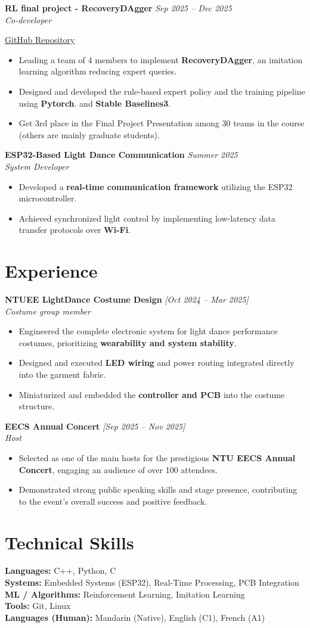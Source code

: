 \documentclass[10pt,a4paper]{article}
\newcommand{\resumeSubheading}[3]{%
  \textbf{#1} \hfill \textit{#3}\\
  \textit{#2}%
}
\newcommand{\resumeItem}[1]{
  \item #1
}
\begin{document}
\resumeSubheading{RL final project - RecoveryDAgger}{Co-developer}{Sep 2025 -- Dec 2025}
\small\href{https://github.com/NTU-RL2025-02/RecoveryDAgger}{GitHub Repository}
\normalsize
\begin{itemize}
  \resumeItem{Leading a team of 4 members to implement \textbf{RecoveryDAgger}, an imitation learning algorithm reducing expert queries.}
  \resumeItem{Designed and developed the rule-based expert policy and the training pipeline using \textbf{Pytorch}. and \textbf{Stable Baselines3}.}
  \resumeItem{Get 3rd place in the Final Project Presentation among 30 teams in the course (others are mainly graduate students).}
\end{itemize}
\resumeSubheading
  {ESP32-Based Light Dance Communication}
  {System Developer}{Summer 2025}
\begin{itemize}
  \resumeItem{Developed a \textbf{real-time communication framework} utilizing the ESP32 microcontroller.}
  \resumeItem{Achieved synchronized light control by implementing low-latency data transfer protocols over \textbf{Wi-Fi}.}
\end{itemize}

\section*{Experience}

\resumeSubheading
  {NTUEE LightDance Costume Design}
  {Costume group member}{[Oct 2024 -- Mar 2025]}
\begin{itemize}
  \resumeItem{Engineered the complete electronic system for light dance performance costumes, prioritizing \textbf{wearability and system stability}.}
  \resumeItem{Designed and executed \textbf{LED wiring} and power routing integrated directly into the garment fabric.}
  \resumeItem{Miniaturized and embedded the \textbf{controller and PCB} into the costume structure.}
\end{itemize}

\resumeSubheading{EECS Annual Concert}{Host}{[Sep 2025 -- Nov 2025]}
\begin{itemize}
  \resumeItem{Selected as one of the main hosts for the prestigious \textbf{NTU EECS Annual Concert}, engaging an audience of over 100 attendees.}
  \resumeItem{Demonstrated strong public speaking skills and stage presence, contributing to the event's overall success and positive feedback.}
\end{itemize}

\section*{Technical Skills}
\textbf{Languages:} C++, Python, C \\
\textbf{Systems:} Embedded Systems (ESP32), Real-Time Processing, PCB Integration \\
\textbf{ML / Algorithms:} Reinforcement Learning, Imitation Learning \\
\textbf{Tools:} Git, Linux\\
\textbf{Languages (Human):} Mandarin (Native), English (C1), French (A1)
\end{document}
